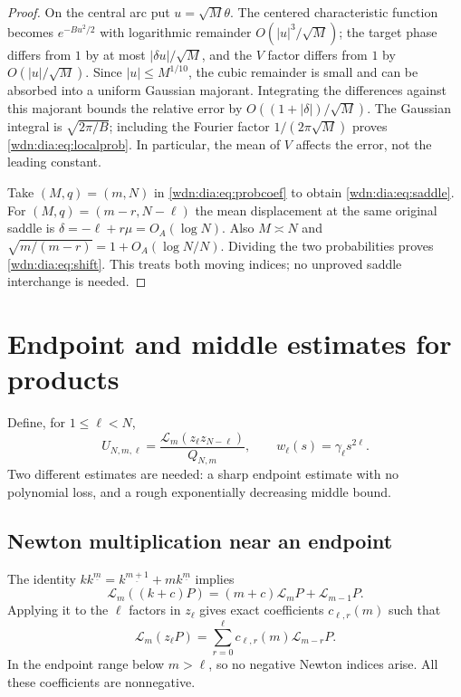 \documentclass[11pt,letterpaper]{article}
\theoremstyle{remark}\newtheorem{remark}[theorem]{Remark}
\newcommand{\LL}{\mathcal L}
\newcommand{\fall}[2]{#1^{\underline{#2}}}
\begin{document}
\begin{proof}
On the central arc put $u=\sqrt M\theta$. The centered characteristic
function becomes $e^{-Bu^2/2}$ with logarithmic remainder
$O(|u|^3/\sqrt M)$; the target phase differs from $1$ by at most
$|\delta u|/\sqrt M$, and the $V$ factor differs from $1$ by
$O(|u|/\sqrt M)$. Since $|u|\le M^{1/10}$, the cubic remainder is small and
can be absorbed into a uniform Gaussian majorant. Integrating the differences
against this majorant bounds the relative error by
$O((1+|\delta|)/\sqrt M)$. The Gaussian integral is $\sqrt{2\pi/B}$;
including the Fourier factor $1/(2\pi\sqrt M)$ proves \eqref{wdn:dia:eq:localprob}.
In particular, the mean of $V$ affects the error, not the leading constant.

Take $(M,q)=(m,N)$ in \eqref{wdn:dia:eq:probcoef} to obtain \eqref{wdn:dia:eq:saddle}.
For $(M,q)=(m-r,N-\ell)$ the mean displacement at the same original saddle is
$\delta=-\ell+r\mu=O_A(\log N)$. Also $M\asymp N$ and
$\sqrt{m/(m-r)}=1+O_A(\log N/N)$. Dividing the two probabilities proves
\eqref{wdn:dia:eq:shift}. This treats both moving indices; no unproved saddle
interchange is needed.
\end{proof}

\section{Endpoint and middle estimates for products}\label{wdn:dia:sec:products}
Define, for $1\le\ell<N$,
\begin{equation}\label{wdn:dia:eq:U}
 U_{N,m,\ell}=\frac{\LL_m(z_\ell z_{N-\ell})}{Q_{N,m}},\qquad
 w_\ell(s)=\gamma_\ell s^{2\ell}.
\end{equation}
Two different estimates are needed: a sharp endpoint estimate with no
polynomial loss, and a rough exponentially decreasing middle bound.

\subsection{Newton multiplication near an endpoint}
The identity $k\fall{k}{m}=\fall{k}{m+1}+m\fall{k}{m}$ implies
\begin{equation}\label{wdn:dia:eq:mult}
 \LL_m((k+c)P)=(m+c)\LL_mP+\LL_{m-1}P.
\end{equation}
Applying it to the $\ell$ factors in $z_\ell$ gives exact coefficients
$c_{\ell,r}(m)$ such that
\begin{equation}\label{wdn:dia:eq:cmult}
 \LL_m(z_\ell P)=\sum_{r=0}^\ell c_{\ell,r}(m)\LL_{m-r}P.
\end{equation}
In the endpoint range below $m>\ell$, so no negative Newton indices arise.
All these coefficients are nonnegative.
\end{document}
